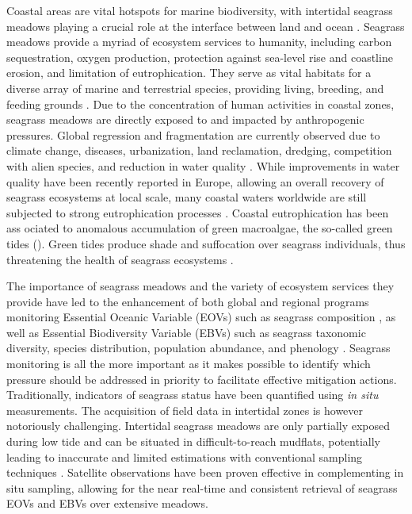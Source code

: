 \documentclass[
  number]{elsarticle}
\begin{document}
Coastal areas are vital hotspots for marine biodiversity, with
intertidal seagrass meadows playing a crucial role at the interface
between land and ocean \citep{unsworth2022}. Seagrass meadows provide a
myriad of ecosystem services to humanity, including carbon
sequestration, oxygen production, protection against sea-level rise and
coastline erosion, and limitation of eutrophication. They serve as vital
habitats for a diverse array of marine and terrestrial species,
providing living, breeding, and feeding grounds \citetext{\citealp[
]{gardner2018}; \citealp[ ]{Zoffoli2022}; \citealp{jankowska2019}}. Due
to the concentration of human activities in coastal zones, seagrass
meadows are directly exposed to and impacted by anthropogenic pressures.
Global regression and fragmentation are currently observed due to
climate change, diseases, urbanization, land reclamation, dredging,
competition with alien species, and reduction in water quality
\citetext{\citealp[ ]{nguyen2021}; \citealp[ ]{soissons2018}; \citealp[
]{orth2006}; \citealp[ ]{lin2018}; \citealp{duffy2019}}. While
improvements in water quality have been recently reported in Europe,
allowing an overall recovery of seagrass ecosystems at local scale, many
coastal waters worldwide are still subjected to strong eutrophication
processes \citetext{\citealp[ ]{deSantos2019}; \citealp{Zoffoli2021}}.
Coastal eutrophication has been ass ociated to anomalous accumulation of
green macroalgae, the so-called green tides
(\citep{devlin2023nutrients}). Green tides produce shade and suffocation
over seagrass individuals, thus threatening the health of seagrass
ecosystems \citep{wang2022}.

The importance of seagrass meadows and the variety of ecosystem services
they provide have led to the enhancement of both global and regional
programs monitoring Essential Oceanic Variable (EOVs) such as seagrass
composition \citep{Miloslavich2018}, as well as Essential Biodiversity
Variable (EBVs) such as seagrass taxonomic diversity, species
distribution, population abundance, and phenology \citep{Pereira2013}.
Seagrass monitoring is all the more important as it makes possible to
identify which pressure should be addressed in priority to facilitate
effective mitigation actions. Traditionally, indicators of seagrass
status have been quantified using \emph{in situ} measurements. The
acquisition of field data in intertidal zones is however notoriously
challenging. Intertidal seagrass meadows are only partially exposed
during low tide and can be situated in difficult-to-reach mudflats,
potentially leading to inaccurate and limited estimations with
conventional sampling techniques \citep{nijland2019}. Satellite
observations have been proven effective in complementing in situ
sampling, allowing for the near real-time and consistent retrieval of
seagrass EOVs and EBVs over extensive meadows. \citetext{\citealp[
]{Zoffoli2021}; \citealp[ ]{xu2021}; \citealp[
]{Traganos2018}; \citealp{coffer2023}}
\end{document}
